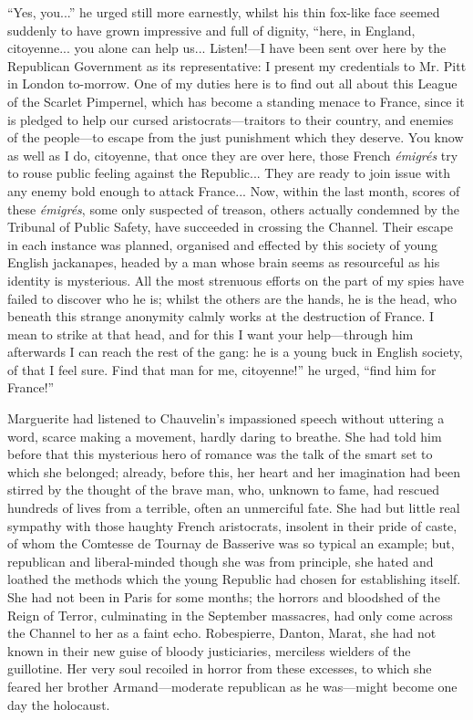 \documentclass[paper=a5,BCOR=7mm,twoside,DIV=calc,12pt,usegeometry,chapterprefix,endperiod,headings=big]{scrbook}
\begin{document}
\enquote{Yes, you...} he urged still more earnestly, whilst his thin fox-like face seemed suddenly to have grown impressive and full of dignity, \enquote{here, in England, citoyenne... you alone can help us... Listen!---I have been sent over here by the Republican Government as its representative: I present my credentials to Mr. Pitt in London to-morrow. One of my duties here is to find out all about this League of the Scarlet Pimpernel, which has become a standing menace to France, since it is pledged to help our cursed aristocrats---traitors to their country, and enemies of the people---to escape from the just punishment which they deserve. You know as well as I do, citoyenne, that once they are over here, those French \textit{émigrés} try to rouse public feeling against the Republic... They are ready to join issue with any enemy bold enough to attack France... Now, within the last month, scores of these \textit{émigrés}, some only suspected of treason, others actually condemned by the Tribunal of Public Safety, have succeeded in crossing the Channel. Their escape in each instance was planned, organised and effected by this society of young English jackanapes, headed by a man whose brain seems as resourceful as his identity is mysterious. All the most strenuous efforts on the part of my spies have failed to discover who he is; whilst the others are the hands, he is the head, who beneath this strange anonymity calmly works at the destruction of France. I mean to strike at that head, and for this I want your help---through him afterwards I can reach the rest of the gang: he is a young buck in English society, of that I feel sure. Find that man for me, citoyenne!} he urged, \enquote{find him for France!}

Marguerite had listened to Chauvelin's impassioned  speech without uttering a word, scarce making a movement, hard\-ly daring to breathe. She had told him before that this mysterious hero of romance was the talk of the smart set to which she belonged; already, before this, her heart and her imagination had been stirred by the thought of the brave man, who, unknown to fame, had rescued hundreds of lives from a terrible, often an unmerciful fate. She had but little real sympathy with those haughty French aristocrats, insolent in their pride of caste, of whom the Comtesse de Tournay de Basserive was so typical an example; but, republican and liberal-minded though she was from principle, she hated and loathed the methods which the young Republic had chosen for establishing itself. She had not been in Paris for some months; the horrors and bloodshed of the Reign of Terror, culminating in the September massacres, had only come across the Channel to her as a faint echo. Robespierre, Danton, Marat, she had not known in their new guise of bloody justiciaries, merciless wielders of the guillotine. Her very soul recoiled in horror from these excesses, to which she feared her brother Armand---moderate republican as he was---might become one day the holocaust.
\end{document}
